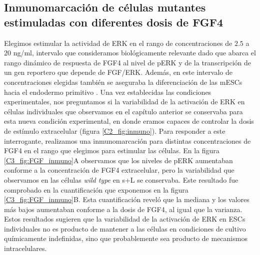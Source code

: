 \documentclass[./main.tex]{subfiles}
\begin{document}
\begin{subappendices}

\chapter{Inmunomarcación de células mutantes estimuladas con diferentes dosis de FGF4}
\label{C3_ap:inmuno}

Elegimos estimular la actividad de ERK en el rango de concentraciones de $2.5$ a $20$ ng/ml, intervalo que consideramos biológicamente relevante dado que abarca el rango dinámico de respuesta de FGF4 al nivel de pERK y de la transcripción de un gen reportero que depende de FGF/ERK. Además, en este intervalo de concentraciones elegidas también se aseguraba la diferenciación de las mESCs hacia el endodermo primitivo \cite{Raina2021}. Una vez establecidas las condiciones experimentales, nos preguntamos si la variabilidad de la activación de ERK en células individuales que observamos en el capítulo anterior se conservaba para esta nueva condición experimental, en donde eramos capaces de controlar la dosis de estímulo extracelular (figura \ref{C2_fig:inmuno}). Para responder a este interrogante, realizamos una inmunomarcación para distintas concentraciones de FGF4 en el rango que elegimos para estimular las células. En la figura \ref{C3_fig:FGF_inmuno}A observamos que los niveles de pERK aumentaban conforme a la concentración de FGF4 extracelular, pero la variabilidad que observamos en las células \textit{wild type} en s+L se conservaba. Este resultado fue comprobado en la cuantificación que exponemos en la figura \ref{C3_fig:FGF_inmuno}B. Esta cuantificación reveló que la mediana y los valores más bajos aumentaban conforme a la dosis de FGF4, al igual que la varianza. Estos resultados sugieren que la variabilidad de la activación de ERK en ESCs individuales no es producto de mantener a las células en condiciones de cultivo químicamente indefinidas, sino que probablemente sea producto de mecanismos intracelulares. 




\end{subappendices}
\end{document}
